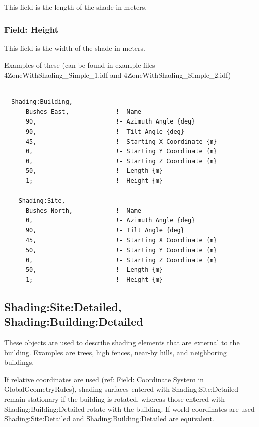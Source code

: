 This field is the length of the shade in meters.

\subsubsection{Field: Height}\label{field-height-10}

This field is the width of the shade in meters.

Examples of these (can be found in example files 4ZoneWithShading\_Simple\_1.idf and 4ZoneWithShading\_Simple\_2.idf)

\begin{lstlisting}

  Shading:Building,
      Bushes-East,             !- Name
      90,                      !- Azimuth Angle {deg}
      90,                      !- Tilt Angle {deg}
      45,                      !- Starting X Coordinate {m}
      0,                       !- Starting Y Coordinate {m}
      0,                       !- Starting Z Coordinate {m}
      50,                      !- Length {m}
      1;                       !- Height {m}

    Shading:Site,
      Bushes-North,            !- Name
      0,                       !- Azimuth Angle {deg}
      90,                      !- Tilt Angle {deg}
      45,                      !- Starting X Coordinate {m}
      50,                      !- Starting Y Coordinate {m}
      0,                       !- Starting Z Coordinate {m}
      50,                      !- Length {m}
      1;                       !- Height {m}
\end{lstlisting}

\subsection{Shading:Site:Detailed, Shading:Building:Detailed}\label{shadingsitedetailed-shadingbuildingdetailed}

These objects are used to describe shading elements that are external to the building. Examples are trees, high fences, near-by hills, and neighboring buildings.

If relative coordinates are used (ref: Field: Coordinate System in GlobalGeometryRules), shading surfaces entered with Shading:Site:Detailed remain stationary if the building is rotated, whereas those entered with Shading:Building:Detailed rotate with the building. If world coordinates are used Shading:Site:Detailed and Shading:Building:Detailed are equivalent.

